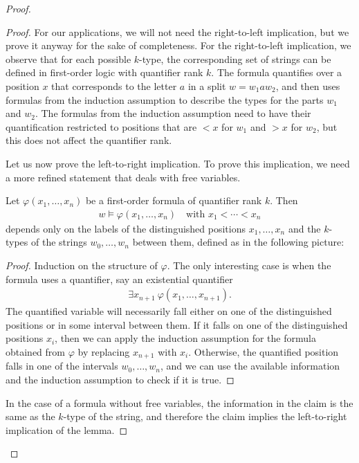\begin{proof}
\begin{proof}
    For our applications, we will not need the right-to-left implication, but we prove it anyway for the sake of completeness.
    For the right-to-left implication, we observe that for each possible $k$-type, the corresponding set of strings can be defined in first-order logic with quantifier rank $k$. The formula quantifies over a position $x$ that  corresponds to the letter $a$ in a split $ w = w_1 a w_2$, and  then uses formulas from the induction assumption to describe the types for the parts $w_1$ and $w_2$. The formulas from the induction assumption need to have their quantification restricted to positions that are $<x$ for $w_1$ and $>x$ for $w_2$, but this does not affect the quantifier rank. 

    Let us now prove the left-to-right implication. To prove this implication, we need a more refined statement that deals with free variables.
    \begin{claim}\label{claim:fo-composition-quantifier-rank}
        Let $\varphi(x_1,\ldots,x_n)$ be a first-order formula of quantifier rank  $k$. Then 
        \begin{align*}
        w \models \varphi(x_1,\ldots,x_n) \quad \text{with }x_1 < \cdots < x_n
        \end{align*}
     depends only on the labels of the distinguished positions $x_1,\ldots,x_n$ and the $k$-types of the strings
     $w_0,\ldots,w_n$ between them, defined as in the following picture:
    \end{claim}
    \begin{proof} Induction on the structure of $\varphi$. The only interesting case is when the formula uses a quantifier, say an existential quantifier
        \begin{align*}
        \exists x_{n+1} \ \varphi(x_1,\ldots,x_{n+1}).
        \end{align*}
        The quantified variable will necessarily fall either on one of the distinguished positions  or in some interval between them. If it falls on one of the distinguished positions $x_i$, then we can apply the induction assumption for the formula obtained from $\varphi$ by replacing $x_{n+1}$ with $x_i$. Otherwise, the quantified position falls in one of the intervals $w_0,\ldots,w_n$, and we can use the available information and the induction assumption to check if it is true.
    \end{proof}
    In the case of a formula without free variables, the information in the claim is the same as the $k$-type of the string, and therefore the claim implies the left-to-right implication of the lemma.
\end{proof}


\end{proof}
